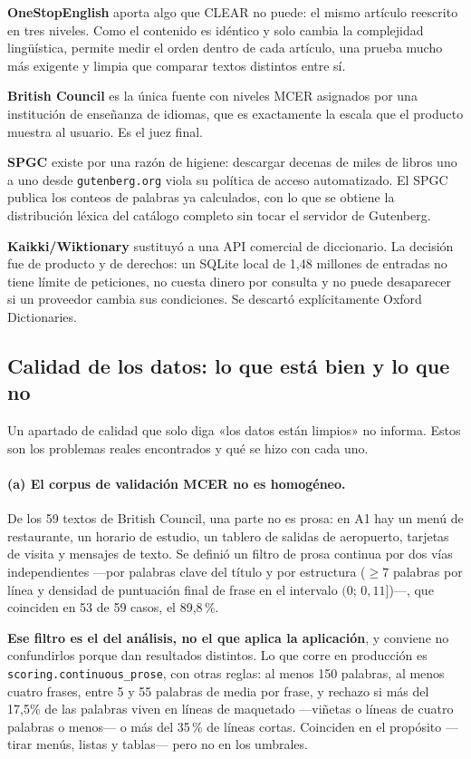 \documentclass[11pt,a4paper]{article}
\newcommand{\cod}[1]{\texttt{\small #1}}
\newcommand{\pct}{\,\%}
\begin{document}
\textbf{OneStopEnglish} aporta algo que CLEAR no puede: el mismo artículo reescrito en
tres niveles. Como el contenido es idéntico y solo cambia la complejidad lingüística,
permite medir el orden dentro de cada artículo, una prueba mucho más exigente y limpia
que comparar textos distintos entre sí.

\textbf{British Council} es la única fuente con niveles MCER asignados por una
institución de enseñanza de idiomas, que es exactamente la escala que el producto
muestra al usuario. Es el juez final.

\textbf{SPGC} existe por una razón de higiene: descargar decenas de miles de libros uno
a uno desde \cod{gutenberg.org} viola su política de acceso automatizado. El SPGC
publica los conteos de palabras ya calculados, con lo que se obtiene la distribución
léxica del catálogo completo sin tocar el servidor de Gutenberg.

\textbf{Kaikki/Wiktionary} sustituyó a una API comercial de diccionario. La decisión fue
de producto y de derechos: un SQLite local de 1,48 millones de entradas no tiene límite
de peticiones, no cuesta dinero por consulta y no puede desaparecer si un proveedor
cambia sus condiciones. Se descartó explícitamente Oxford Dictionaries.

\subsection{Calidad de los datos: lo que está bien y lo que no}
\label{sec:calidad}

Un apartado de calidad que solo diga «los datos están limpios» no informa. Estos son los
problemas reales encontrados y qué se hizo con cada uno.

\paragraph{(a) El corpus de validación MCER no es homogéneo.} De los 59 textos de
British Council, una parte no es prosa: en A1 hay un menú de restaurante, un horario de
estudio, un tablero de salidas de aeropuerto, tarjetas de visita y mensajes de texto.
Se definió un filtro de prosa continua por dos vías independientes —por palabras clave
del título y por estructura ($\geq 7$ palabras por línea y densidad de puntuación final
de frase en el intervalo $(0;\,0{,}11]$)—, que coinciden en 53 de 59 casos, el 89,8\pct.

\textbf{Ese filtro es el del análisis, no el que aplica la aplicación}, y conviene no
confundirlos porque dan resultados distintos. Lo que corre en producción es
\cod{scoring.continuous\_prose}, con otras reglas: al menos 150 palabras, al menos cuatro
frases, entre 5 y 55 palabras de media por frase, y rechazo si más del 17,5\% de las
palabras viven en líneas de maquetado —viñetas o líneas de cuatro palabras o menos— o más
del 35\pct{} de líneas cortas. Coinciden en el propósito —tirar menús, listas y tablas—
pero no en los umbrales.
\end{document}
